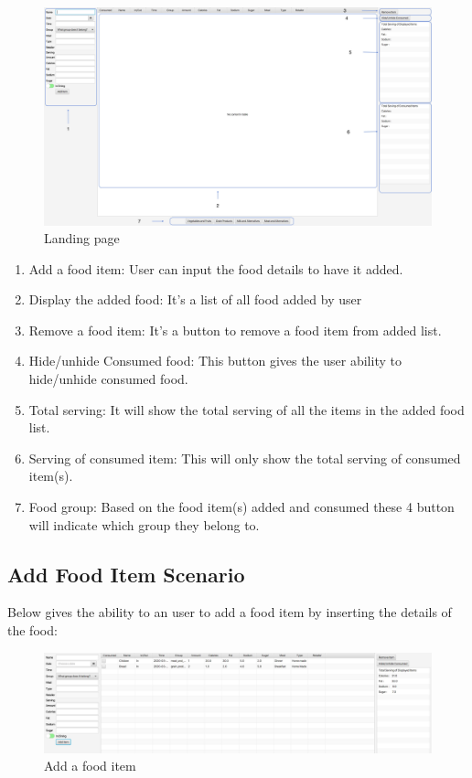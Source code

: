 \documentclass{scrreprt}
\begin{document}
\begin{figure}[!htbp]
\centering
\includegraphics[width=15cm]{pictures/raw.png}
\caption*{Landing page}
\end{figure}
\FloatBarrier
\begin{enumerate}
\item Add a food item: User can input the food details to have it added.
\item Display the added food: It's a list of all food added by user
\item Remove a food item: It's a button to remove a food item from added list.
\item Hide/unhide Consumed food: This button gives the user ability to hide/unhide consumed food.
\item Total serving: It will show the total serving of all the items in the added food list.
\item Serving of consumed item: This will only show the total serving of consumed item(s).
\item Food group: Based on the food item(s) added and consumed these 4 button will indicate which group they belong to.
\end{enumerate}
	
\subsection{Add Food Item Scenario}

Below gives the ability to an user to add a food item by inserting the details of the food:

\begin{figure}[!htbp]
\centering
\includegraphics[width=15cm]{pictures/add-food-item.png}
\caption*{Add a food item}
\end{figure}
\end{document}
